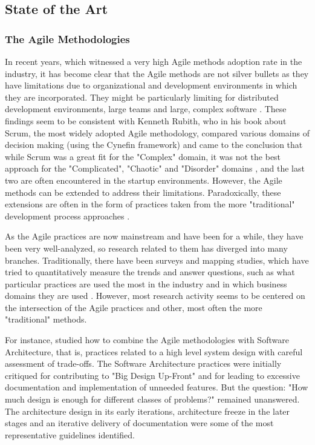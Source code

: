 \documentclass{article}
\begin{document}
\subsection{State of the Art}
\subsubsection{The Agile Methodologies}
In recent years, which witnessed a very high Agile methods adoption rate in the industry, it has become clear that the Agile methods are not silver bullets as they have limitations due to organizational and development environments in which they are incorporated. They might be particularly limiting for distributed development environments, large teams and large, complex software \citep{turk2014assumptions}. These findings seem to be consistent with Kenneth Rubith, who in his book about Scrum, the most widely adopted Agile methodology, compared various domains of decision making (using the Cynefin framework) and came to the conclusion that while Scrum was a great fit for the "Complex" domain, it was not the best approach for the "Complicated", "Chaotic" and "Disorder" domains \citep[5-10]{rubin2012essential}, and the last two are often encountered in the startup environments. However, the Agile methods can be extended to address their limitations. Paradoxically, these extensions are often in the form of practices taken from the more "traditional" development process approaches \citep{turk2014limitations}.

As the Agile practices are now mainstream and have been for a while, they have been very well-analyzed, so research related to them has diverged into many branches. Traditionally, there have been surveys and mapping studies, which have tried to quantitatively measure the trends and answer questions, such as what particular practices are used the most in the industry and in which business domains they are used \citep{diebold2014Agile}. However, most research activity seems to be centered on the intersection of the Agile practices and other, most often the more "traditional" methods.

For instance, \cite{yang2016systematic} studied how to combine the Agile methodologies with Software Architecture, that is, practices related to a high level system design with careful assessment of trade-offs. The Software Architecture practices were initially critiqued for contributing to "Big Design Up-Front" and for leading to excessive documentation and implementation of unneeded features. But the question: "How much design is enough for different classes of problems?" remained unanswered. The architecture design in its early iterations, architecture freeze in the later stages and an iterative delivery of documentation were some of the most representative guidelines identified.
\end{document}

